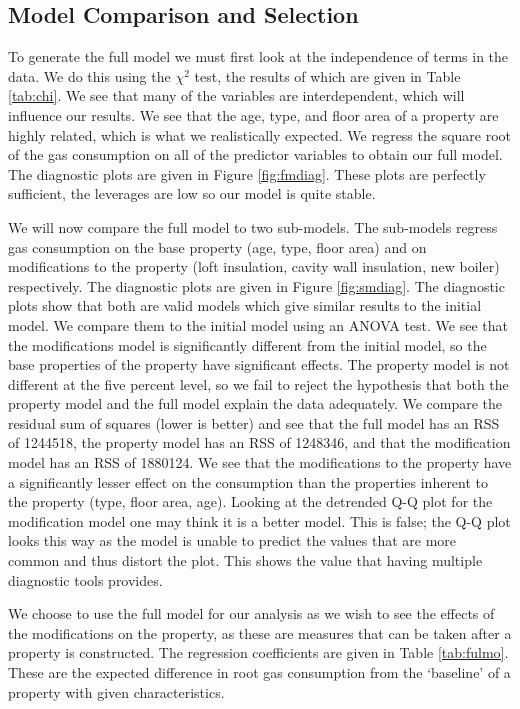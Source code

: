\documentclass[8pt]{extarticle}
\begin{document}
\subsection{Model Comparison and Selection}
To generate the full model we must first look at the independence of terms in the data. We do this using the $\chi^2$ test, the results of which are given in Table \ref{tab:chi}. We see that many of the variables are interdependent, which will influence our results. We see that the age, type, and floor area of a property are highly related, which is what we realistically expected. We regress the square root of the gas consumption on all of the predictor variables to obtain our full model. The diagnostic plots are given in Figure \ref{fig:fmdiag}. These plots are perfectly sufficient, the leverages are low so our model is quite stable. 

We will now compare the full model to two sub-models. The sub-models regress gas consumption on the base property (age, type, floor area) and on modifications to the property (loft insulation, cavity wall insulation, new boiler) respectively. The diagnostic plots are given in Figure \ref{fig:smdiag}. The diagnostic plots show that both are valid models which give similar results to the initial model. We compare them to the initial model using an ANOVA test. We see that the modifications model is significantly different from the initial model, so the base properties of the property have significant effects. The property model is not different at the five percent level, so we fail to reject the hypothesis that both the property model and the full model explain the data adequately. We compare the residual sum of squares (lower is better) and see that the full model has an RSS of 1244518, the property model has an RSS of 1248346, and that the modification model has an RSS of 1880124. We see that the modifications to the property have a significantly lesser effect on the consumption than the properties inherent to the property (type, floor area, age). Looking at the detrended Q-Q plot for the modification model one may think it is a better model. This is false; the Q-Q plot looks this way as the model is unable to predict the values that are more common and thus distort the plot. This shows the value that having multiple diagnostic tools provides.

We choose to use the full model for our analysis as we wish to see the effects of the modifications on the property, as these are measures that can be taken after a property is constructed. The regression coefficients are given in Table \ref{tab:fulmo}. These are the expected difference in root gas consumption from the `baseline' of a property with given characteristics.
\end{document}
